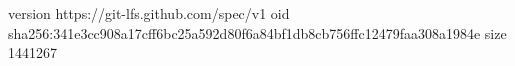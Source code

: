 version https://git-lfs.github.com/spec/v1
oid sha256:341e3cc908a17cff6bc25a592d80f6a84bf1db8cb756ffc12479faa308a1984e
size 1441267
